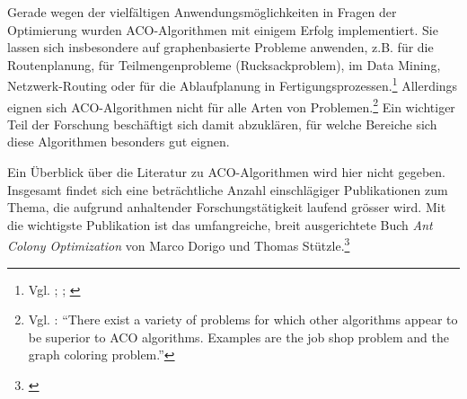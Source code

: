 Gerade wegen der vielfältigen Anwendungsmöglichkeiten in Fragen der Optimierung wurden ACO-Algorithmen mit einigem Erfolg implementiert. Sie lassen sich insbesondere auf graphenbasierte Probleme anwenden, z.B. für die Routenplanung, für Teilmengenprobleme (Rucksackproblem), im Data Mining, Netzwerk-Routing oder für die Ablaufplanung in Fertigungsprozessen.\footnote{Vgl. \cite[S. 15\,ff.]{sch-koa}; \cite[S. 153\,ff.]{ds-ant}; \cite{wiki-antalg}} Allerdings eignen sich ACO-Algorithmen nicht für alle Arten von Problemen.\footnote{Vgl. \cite[S. 121]{ds-ant}: \enquote{There exist a variety of problems for which other algorithms appear to be superior to ACO algorithms. Examples are the job shop problem and the graph coloring problem.}} Ein wichtiger Teil der Forschung beschäftigt sich damit abzuklären, für welche Bereiche sich diese Algorithmen besonders gut eignen.

Ein Überblick über die Literatur zu ACO-Algorithmen wird hier nicht gegeben. Insgesamt findet sich eine beträchtliche Anzahl einschlägiger Publikationen zum Thema, die aufgrund anhaltender Forschungstätigkeit laufend grösser wird. Mit die wichtigste Publikation ist das umfangreiche, breit ausgerichtete Buch \textit{Ant Colony Optimization} von Marco Dorigo und Thomas Stützle.\footnote{\cite{ds-ant}} \\



\vspace*{1cm}
